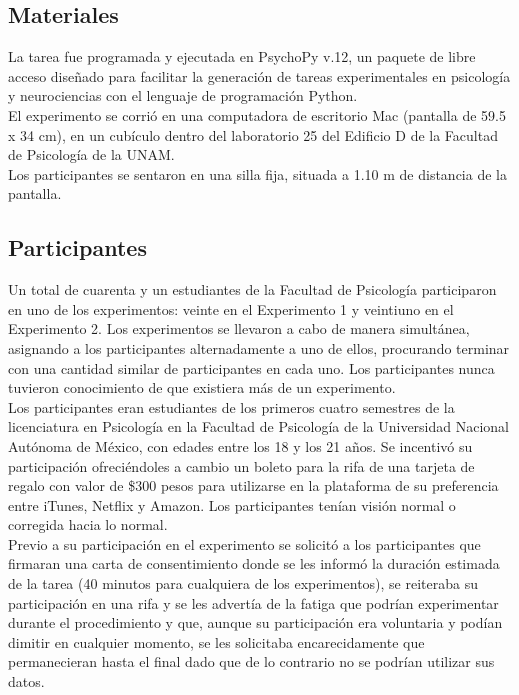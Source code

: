 \subsection{Materiales}

La tarea fue programada y ejecutada en PsychoPy v.12, un paquete de libre acceso diseñado para facilitar la generación de tareas experimentales en psicología y neurociencias con el lenguaje de programación Python.\\

El experimento se corrió en una computadora de escritorio Mac (pantalla de 59.5 x 34 cm), en un cubículo dentro del laboratorio 25 del Edificio D de la Facultad de Psicología de la UNAM. \\

Los participantes se sentaron en una silla fija, situada a 1.10 m de distancia de la pantalla.\\ 


\subsection{Participantes}

Un total de cuarenta y un estudiantes de la Facultad de Psicología participaron en uno de los experimentos: veinte en el Experimento 1 y veintiuno en el Experimento 2. Los experimentos se llevaron a cabo de manera simultánea, asignando a los participantes alternadamente a uno de ellos, procurando terminar con una cantidad similar de participantes en cada uno. Los participantes nunca tuvieron conocimiento de que existiera más de un experimento.\\

Los participantes eran estudiantes de los primeros cuatro semestres de la licenciatura en Psicología en la Facultad de Psicología de la Universidad Nacional Autónoma de México, con edades entre los 18 y los 21 años. Se incentivó su participación ofreciéndoles a cambio un boleto para la rifa de una tarjeta de regalo con valor de \$300 pesos para utilizarse en la plataforma de su preferencia entre iTunes, Netflix y Amazon. Los participantes tenían visión normal o corregida hacia lo normal.\\ 

Previo a su participación en el experimento se solicitó a los participantes que firmaran una carta de consentimiento donde se les informó la duración estimada de la tarea (40 minutos para cualquiera de los experimentos), se reiteraba su participación en una rifa y se les advertía de la fatiga que podrían experimentar durante el procedimiento y que, aunque su participación era voluntaria y podían dimitir en cualquier momento, se les solicitaba encarecidamente que permanecieran hasta el final dado que de lo contrario no se podrían utilizar sus datos.\\

